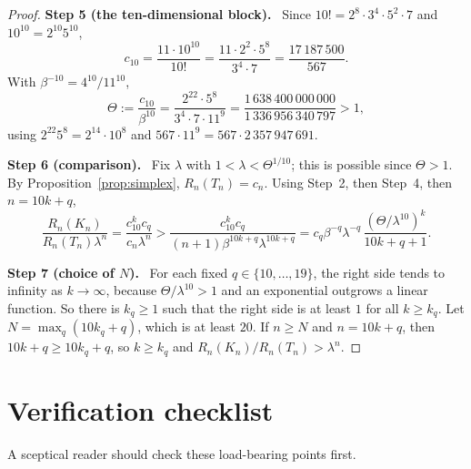 \documentclass[11pt]{article}
\newcommand{\step}[1]{\par\smallskip\noindent\textbf{#1}\ }
\begin{document}
\begin{proof}
\step{Step 5 (the ten-dimensional block).} Since
\(10!=2^8\cdot3^4\cdot5^2\cdot7\) and \(10^{10}=2^{10}5^{10}\),
\[
 c_{10}=\frac{11\cdot10^{10}}{10!}
 =\frac{11\cdot2^2\cdot5^8}{3^4\cdot7}
 =\frac{17\,187\,500}{567}.
\]
With \(\beta^{-10}=4^{10}/11^{10}\),
\[
 \Theta:=\frac{c_{10}}{\beta^{10}}
 =\frac{2^{22}\cdot5^8}{3^4\cdot7\cdot11^9}
 =\frac{1\,638\,400\,000\,000}{1\,336\,956\,340\,797}>1 ,
\]
using \(2^{22}5^8=2^{14}\cdot10^8\) and
\(567\cdot11^9=567\cdot2\,357\,947\,691\).

\step{Step 6 (comparison).} Fix \(\lambda\) with
\(1<\lambda<\Theta^{1/10}\); this is possible since \(\Theta>1\). By
Proposition~\ref{prop:simplex}, \(R_n(T_n)=c_n\). Using Step~2, then
Step~4, then \(n=10k+q\),
\[
 \frac{R_n(K_n)}{R_n(T_n)\lambda^n}
 =\frac{c_{10}^kc_q}{c_n\lambda^n}
 >\frac{c_{10}^kc_q}{(n+1)\beta^{10k+q}\lambda^{10k+q}}
 =c_q\beta^{-q}\lambda^{-q}\,
   \frac{(\Theta/\lambda^{10})^k}{10k+q+1}.
\]

\step{Step 7 (choice of \(N\)).} For each fixed
\(q\in\{10,\ldots,19\}\), the right side tends to infinity as
\(k\to\infty\), because \(\Theta/\lambda^{10}>1\) and an exponential
outgrows a linear function. So there is \(k_q\ge1\) such that the right
side is at least \(1\) for all \(k\ge k_q\). Let
\(N=\max_q(10k_q+q)\), which is at least \(20\). If \(n\ge N\) and
\(n=10k+q\), then \(10k+q\ge10k_q+q\), so \(k\ge k_q\) and
\(R_n(K_n)/R_n(T_n)>\lambda^n\).
\end{proof}

\section{Verification checklist}

A sceptical reader should check these load-bearing points first.
\end{document}
